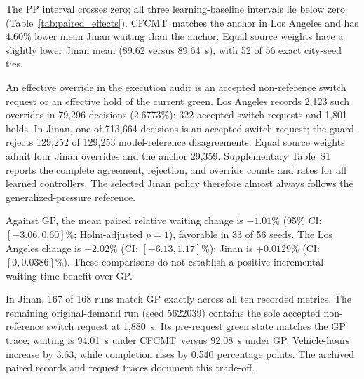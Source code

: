 \documentclass[letterpaper,journal]{IEEEtran}
\newcommand{\method}{CFCMT}
\begin{document}
The PP interval crosses zero; all three learning-baseline intervals lie below zero (Table~\ref{tab:paired_effects}). \method\ matches the anchor in Los Angeles and has 4.60\% lower mean Jinan waiting than the anchor. Equal source weights have a slightly lower Jinan mean (89.62 versus 89.64~s), with 52 of 56 exact city-seed ties.

An effective override in the execution audit is an accepted non-reference switch request or an effective hold of the current green. Los Angeles records 2,123 such overrides in 79,296 decisions (2.6773\%): 322 accepted switch requests and 1,801 holds. In Jinan, one of 713,664 decisions is an accepted switch request; the guard rejects 129,252 of 129,253 model-reference disagreements. Equal source weights admit four Jinan overrides and the anchor 29,359. Supplementary Table~S1 reports the complete agreement, rejection, and override counts and rates for all learned controllers. The selected Jinan policy therefore almost always follows the generalized-pressure reference.

Against GP, the mean paired relative waiting change is $-1.01\%$ (95\% CI: $[-3.06,0.60]\%$; Holm-adjusted $p=1$), favorable in 33 of 56 seeds. The Los Angeles change is $-2.02\%$ (CI: $[-6.13,1.17]\%$); Jinan is $+0.0129\%$ (CI: $[0,0.0386]\%$). These comparisons do not establish a positive incremental waiting-time benefit over GP.

In Jinan, 167 of 168 runs match GP exactly across all ten recorded metrics. The remaining original-demand run (seed 5622039) contains the sole accepted non-reference switch request at 1,880~s. Its pre-request green state matches the GP trace; waiting is 94.01~s under \method\ versus 92.08~s under GP. Vehicle-hours increase by 3.63, while completion rises by 0.540 percentage points. The archived paired records and request traces document this trade-off.
\end{document}
